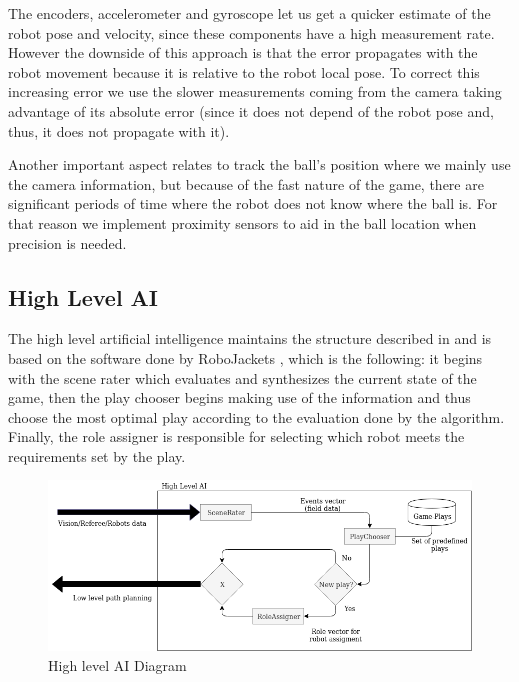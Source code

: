 \documentclass{llncs}
\begin{document}
The encoders, accelerometer and gyroscope let us get a quicker estimate of the robot pose and velocity, since these components have a high measurement rate. However the downside of this approach is that the error propagates with the robot movement because it is relative to the robot local pose. To correct this increasing error we use the slower measurements coming from the camera taking advantage of its absolute error (since it does not depend of the robot pose and, thus, it does not propagate with it).    

Another important aspect relates to track the ball's position where we mainly use the camera information, but because of the fast nature of the game, there are significant periods of time where the robot does not know where the ball is. For that reason we implement proximity sensors to aid in the ball location when precision is needed.  

\subsection{High Level AI}

The high level artificial intelligence maintains the structure described in \cite{ais2018tdp} and is based on the software done by RoboJackets \cite{robojackets}, which is the following: it begins with the scene rater which evaluates and synthesizes the current state of the game, then the play chooser begins making use of the information and thus choose the most optimal play according to the evaluation done by the algorithm. Finally, the role assigner is responsible for selecting which robot meets the requirements set by the play.

\begin{figure}[h]
    \centering
    \includegraphics[scale=0.4]{aiDiagram.png}
    \caption{High level AI Diagram}
    \label{fig:ai}
\end{figure}
\end{document}
